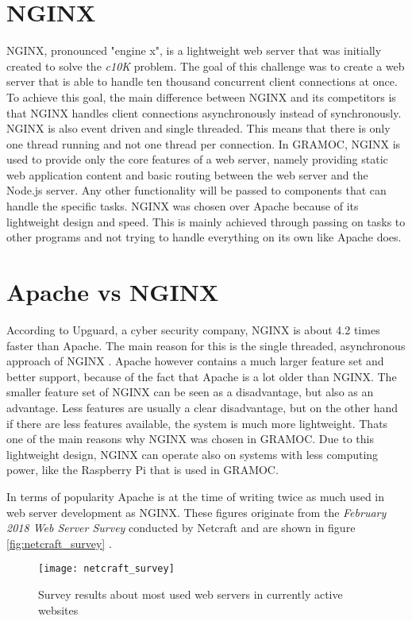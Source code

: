 \section{NGINX}
NGINX, pronounced "engine x", is a lightweight web server that was initially created to solve the \textit{c10K} problem. The goal of this challenge was to create a web server that is able to handle ten thousand concurrent client connections at once. To achieve this goal, the main difference between NGINX and its competitors is that NGINX handles client connections asynchronously instead of synchronously. NGINX is also event driven and single threaded. This means that there is only one thread running and not one thread per connection. In GRAMOC, NGINX is used to provide only the core features of a web server, namely providing static web application content and basic routing between the web server and the Node.js server. Any other functionality will be passed to components that can handle the specific tasks. NGINX was chosen over Apache because of its lightweight design and speed. This is mainly achieved through passing on tasks to other programs and not trying to handle everything on its own like Apache does.

\section{Apache vs NGINX}
According to Upguard, a cyber security company, NGINX is about 4.2 times faster than Apache. The main reason for this is the single threaded, asynchronous approach of NGINX \autocite{UpguardAvN}.
Apache however contains a much larger feature set and better support, because of the fact that Apache is a lot older than NGINX. The smaller feature set of NGINX can be seen as a disadvantage, but also as an advantage. Less features are usually a clear disadvantage, but on the other hand if there are less features available, the system is much more lightweight. Thats one of the main reasons why NGINX was chosen in GRAMOC. Due to this lightweight design, NGINX can operate also on systems with less computing power, like the Raspberry Pi that is used in GRAMOC.

In terms of popularity Apache is at the time of writing twice as much used in web server development as NGINX. These figures originate from the \textit{February 2018 Web Server Survey} conducted by Netcraft and are shown in figure \vref{fig:netcraft_survey} \autocite{netcraft_survey}.

\begin{figure}[h]
    \centering
    \texttt{[image: netcraft\_survey]}
    \caption{Survey results about most used web servers in currently active websites}
    \label{fig:netcraft_survey}
\end{figure}

